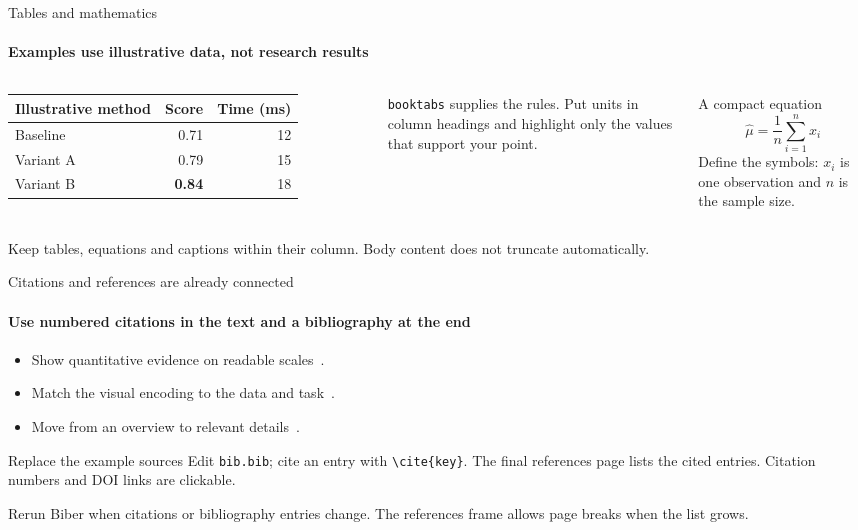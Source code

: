\documentclass[aspectratio=169,10pt]{beamer}
\begin{document}
\begin{frame}{Tables and mathematics}
  \framesubtitle{Examples use illustrative data, not research results}
  \begin{columns}[T,onlytextwidth]
      \small
      \begin{tabular}{@{}lrr@{}}
        \toprule
        \textbf{Illustrative method} & \textbf{Score} & \textbf{Time (ms)}\\
        \midrule
        Baseline & 0.71 & 12\\
        Variant A & 0.79 & 15\\
        Variant B & \textbf{0.84} & 18\\
        \bottomrule
      \end{tabular}
      \par\medskip
      \texttt{booktabs} supplies the rules. Put units in column headings and highlight only the values that support your point.
      \begin{exampleblock}{A compact equation}
        \[
          \widehat{\mu}=\frac{1}{n}\sum_{i=1}^{n}x_i
        \]
        Define the symbols: $x_i$ is one observation and $n$ is the sample size.
      \end{exampleblock}
  \end{columns}
  \vfill
  \textcolor{DASEslate}{\small Keep tables, equations and captions within their column. Body content does not truncate automatically.}
\end{frame}

\begin{frame}{Citations and references are already connected}
  \framesubtitle{Use numbered citations in the text and a bibliography at the end}
  \begin{itemize}
    \setlength{\itemsep}{.8em}
    \item Show quantitative evidence on readable scales~\cite{tufte1983}.
    \item Match the visual encoding to the data and task~\cite{munzner2014}.
    \item Move from an overview to relevant details~\cite{shneiderman1996}.
  \end{itemize}
  \medskip
  \begin{block}{Replace the example sources}
    Edit \texttt{bib.bib}; cite an entry with \texttt{\textbackslash cite\{key\}}. The final references page lists the cited entries. Citation numbers and DOI links are clickable.
  \end{block}
  \small Rerun Biber when citations or bibliography entries change. The references frame allows page breaks when the list grows.
\end{frame}
\end{document}
